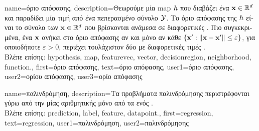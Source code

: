 {name={\foreignlanguage{greek}{όριο απόφασης}}, 
	description={\foreignlanguage{greek}{Θεωρούμε μία}  
		\gls{map}  $h$ \foreignlanguage{greek}{που διαβάζει ένα}   
		${\bf x} \in \mathbb{R}^{d}$ \foreignlanguage{greek}{και παραδίδει μία τιμή από ένα πεπερασμένο σύνολο $\mathcal{Y}$. 
		Το όριο απόφασης της $h$ είναι το σύνολο των}  ${\bf x} \in \mathbb{R}^{d}$ 
		\foreignlanguage{greek}{που βρίσκονται ανάμεσα σε διαφορετικές} . \foreignlanguage{greek}{Πιο συγκεκριμένα, 
		ένα}  ${\bf x}$ \foreignlanguage{greek}{ανήκει στο όριο απόφασης αν και μόνο αν κάθε}  
		$\{ {\bf x}': \| {\bf x} - {\bf x}' \| \leq \varepsilon \}$, \foreignlanguage{greek}{για οποιοδήποτε $\varepsilon >0$, περιέχει 
		τουλάχιστον δύο}  \foreignlanguage{greek}{με διαφορετικές τιμές} .\\
		\foreignlanguage{greek}{Βλέπε επίσης:} \gls{hypothesis}, \gls{map}, \gls{featurevec}, \gls{vector}, \gls{decisionregion}, \gls{neighborhood}, \gls{function}.},
	first={\foreignlanguage{greek}{όριο απόφασης}},
	text={\foreignlanguage{greek}{όριο απόφασης}},
	user1={\foreignlanguage{greek}{όριο απόφασης}}, %
	user2={\foreignlanguage{greek}{ορίου απόφασης}}, %
	user3={\foreignlanguage{greek}{ορίο απόφασης}} %
}

{name={\foreignlanguage{greek}{παλινδρόμηση}},
	description={\foreignlanguage{greek}{Τα προβλήματα παλινδρόμησης} 
		\foreignlanguage{greek}{περιστρέφονται γύρω από την}  
		 \foreignlanguage{greek}{μίας αριθμητικής}  \foreignlanguage{greek}{μόνο από τα} 
		 \foreignlanguage{greek}{ενός}  \cite[\foreignlanguage{greek}{Κεφ.} 2]{MLBasics}.\\
		\foreignlanguage{greek}{Βλέπε επίσης:} \gls{prediction}, \gls{label}, \gls{feature}, \gls{datapoint}.},
	first={regression},
	text={regression},
	user1={\foreignlanguage{greek}{παλινδρόμηση}}, %
  	user2={\foreignlanguage{greek}{παλινδρόμησης}} %
}

